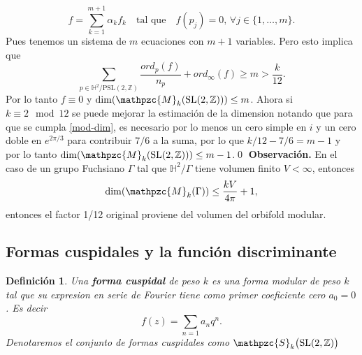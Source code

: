 \documentclass[letterpaper]{article}
\newtheorem{def.}{Definici\'on}[section]
\newcommand{\obs}{{\newline \noindent \sc \textbf{Observación. }}}
\newcommand{\ga}{\ensuremath{\Gamma}}
\newcommand{\slz}{\ensuremath{\mathrm{SL}(2,\mathbb Z) }}
\newcommand{\pslz}{\ensuremath{\mathrm{PSL}(2,\mathbb Z) }}
\newcommand{\hd}{\ensuremath{\mathbb H^2}}
\newcommand{\mdlr}{\ensuremath{\mathpzc{M}}}
\begin{document}
\[
    f=\sum_{k=1}^{m+1}\alpha_kf_k\quad\text{tal que}\quad f(p_j)=0,\,\forall j\in\{1,\dots,m\}.
\]
Pues tenemos un sistema de \(m\) ecuaciones con \(m+1\) variables. Pero esto implica que
\[
    \sum_{p\in\hd/\pslz} \frac{ord_p(f)}{n_p}+ord_{\infty}(f)\geq m>\frac{k}{12}.
\]
Por lo tanto \(f\equiv0\) y \(\dim(\mdlr_k(\slz))\leq m\). Ahora si \(k\equiv2\mod12\) se puede mejorar la estimación de la dimension notando que para que se cumpla \ref{mod-dim}, es necesario por lo menos un cero simple en \(i\) y un cero doble en \(e^{2\pi/3}\) para contribuir \(7/6\) a la suma, por lo que \(k/12-7/6=m-1\) y  por lo tanto \(\dim(\mdlr_k(\slz))\leq m-1\).\qed
\obs En el caso de un grupo Fuchsiano \(\ga\) tal que \(\hd/\ga\) tiene volumen finito \(V<\infty\), entonces
\[
    \dim(\mdlr_k(\ga))\leq \frac{kV}{4\pi}+1,
\]
entonces el factor 1/12 original proviene del volumen del orbifold modular.
\subsection{Formas cuspidales y la función discriminante}
\label{sec:org8c549c6}
\begin{def.}
Una \textbf{forma cuspidal} de peso \(k\) es una forma modular de peso \(k\) tal que su expresion en serie de Fourier tiene como primer coeficiente cero \(a_0=0\). Es decir
\[
    f(z)=\sum_{n=1}a_nq^n.
\]
Denotaremos el conjunto de formas cuspidales como \(\mathpzc{S}_k\big(\slz\big)\)
\end{def.}
\end{document}
